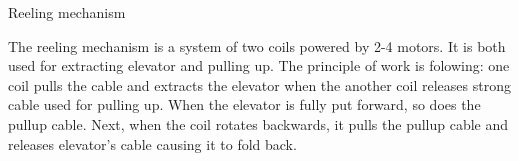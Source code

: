 \begin{enumerate*}
    \item Reeling mechanism
    \begin{enumerate*}
    	\item The reeling mechanism is a system of two coils powered by 2-4 motors. It is both used for extracting elevator and pulling up. The principle of work is folowing: one coil pulls the cable and extracts the elevator when the another coil releases strong cable used for pulling up. When the elevator is fully put forward, so does the pullup cable. Next, when the coil rotates backwards, it pulls the pullup cable and releases elevator's cable causing it to fold back.
    \end{enumerate*}
  
  \end{enumerate*}	
  
  
  